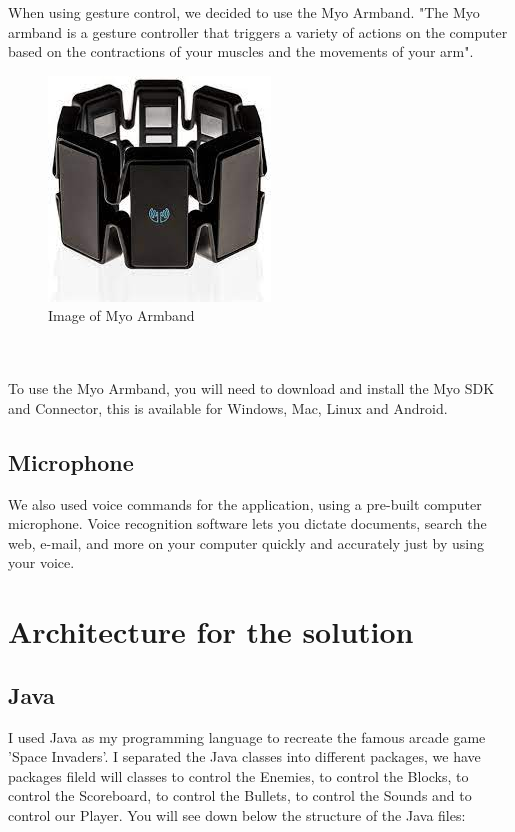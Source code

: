 \documentclass{article}
\begin{document}
When using gesture control, we decided to use the Myo Armband. "The Myo armband is a gesture controller that triggers a variety of actions on the computer based on the contractions of your muscles and the movements of your arm".
\begin{figure}[h]
    \includegraphics[scale=0.6]{img/myoarmband2.jpg}
    \centering
    \caption{Image of Myo Armband}
    \label{fig: A Picture of the Myo Armband}
\end{figure}
\\ \\
To use the Myo Armband, you will need to download and install the Myo SDK and Connector, this is available for Windows, Mac, Linux and Android.

\subsection{Microphone}

We also used voice commands for the application, using a pre-built computer microphone. Voice recognition software lets you dictate documents, search the web, e-mail, and more on your computer quickly and accurately just by using your voice.

\section{Architecture for the solution}

\subsection{Java}

\hfill \break
I used Java as my programming language to recreate the famous arcade game 'Space Invaders'. I separated the Java classes into different packages, we have packages fileld will classes to control the Enemies, to control the Blocks, to control the Scoreboard, to control the Bullets, to control the Sounds and to control our Player. You will see down below the structure of the Java files:
\end{document}
